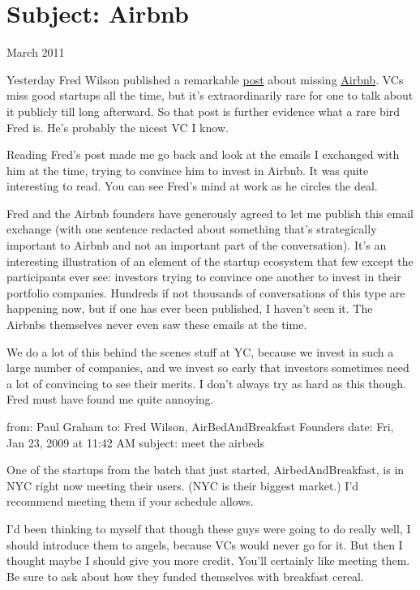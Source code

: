 \chapter{Subject: Airbnb}

March 2011

Yesterday Fred Wilson published a remarkable
\href{http://avc.com/2011/03/airbnb}{post} about missing
\href{http://airbnb.com}{Airbnb}. VCs miss good startups all the time,
but it's extraordinarily rare for one to talk about it publicly till
long afterward. So that post is further evidence what a rare bird Fred
is. He's probably the nicest VC I know.

Reading Fred's post made me go back and look at the emails I exchanged
with him at the time, trying to convince him to invest in Airbnb. It was
quite interesting to read. You can see Fred's mind at work as he circles
the deal.

Fred and the Airbnb founders have generously agreed to let me publish
this email exchange (with one sentence redacted about something that's
strategically important to Airbnb and not an important part of the
conversation). It's an interesting illustration of an element of the
startup ecosystem that few except the participants ever see: investors
trying to convince one another to invest in their portfolio companies.
Hundreds if not thousands of conversations of this type are happening
now, but if one has ever been published, I haven't seen it. The Airbnbs
themselves never even saw these emails at the time.

We do a lot of this behind the scenes stuff at YC, because we invest in
such a large number of companies, and we invest so early that investors
sometimes need a lot of convincing to see their merits. I don't always
try as hard as this though. Fred must have found me quite annoying.

from: Paul Graham to: Fred Wilson, AirBedAndBreakfast Founders date:
Fri, Jan 23, 2009 at 11:42 AM subject: meet the airbeds

One of the startups from the batch that just started,
AirbedAndBreakfast, is in NYC right now meeting their users. (NYC is
their biggest market.) I'd recommend meeting them if your schedule
allows.

I'd been thinking to myself that though these guys were going to do
really well, I should introduce them to angels, because VCs would never
go for it. But then I thought maybe I should give you more credit.
You'll certainly like meeting them. Be sure to ask about how they funded
themselves with breakfast cereal.

